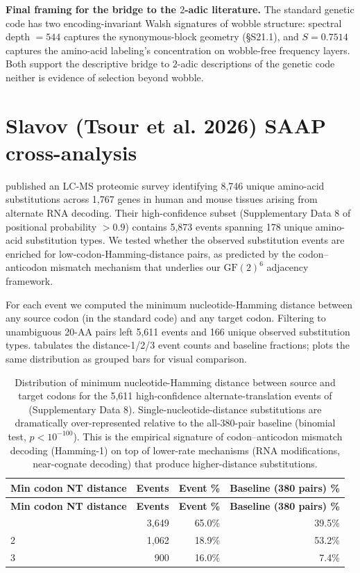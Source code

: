 \documentclass[preprint,11pt,authoryear,a4paper]{elsarticle}
\begin{document}
\textbf{Final framing for the bridge to the \(2\)-adic literature.} The
standard genetic code has two encoding-invariant Walsh signatures of
wobble structure: spectral depth \(= 544\) captures the synonymous-block
geometry (§S21.1), and \(S = 0.7514\) captures the amino-acid labeling's
concentration on wobble-free frequency layers. Both support the
descriptive bridge to \(2\)-adic descriptions of the genetic code
\citep{khrennikov2007, axelsson2024a} neither is evidence of selection
beyond wobble.

\section{Slavov (Tsour et al. 2026) SAAP
cross-analysis}\label{sec:s-slavov}

\citep{tsour2026} published an LC-MS proteomic survey identifying 8,746
unique amino-acid substitutions across 1,767 genes in human and mouse
tissues arising from alternate RNA decoding. Their high-confidence
subset (Supplementary Data 8 of \citep{tsour2026} positional probability
\(> 0.9\)) contains 5,873 events spanning 178 unique amino-acid
substitution types. We tested whether the observed substitution events
are enriched for low-codon-Hamming-distance pairs, as predicted by the
codon--anticodon mismatch mechanism that underlies our
\({\text{GF}(2)}^{6}\) adjacency framework.

For each event we computed the minimum nucleotide-Hamming distance
between any source codon (in the standard code) and any target codon.
Filtering to unambiguous 20-AA pairs left 5,611 events and 166 unique
observed substitution types.  tabulates the
distance-1/2/3 event counts and baseline fractions;
 plots the same distribution as grouped bars
for visual comparison.

\begin{longtable}[]{@{}lrrr@{}}
\caption{Distribution of minimum nucleotide-Hamming distance between
source and target codons for the 5,611 high-confidence
alternate-translation events of \citep{tsour2026} (Supplementary Data
8). Single-nucleotide-distance substitutions are dramatically
over-represented relative to the all-380-pair baseline (binomial test,
\(p < 10^{- 100}\)). This is the empirical signature of codon--anticodon
mismatch decoding (Hamming-1) on top of lower-rate mechanisms (RNA
modifications, near-cognate decoding) that produce higher-distance
substitutions.}\tabularnewline
\toprule\noalign{}
\textbf{Min codon NT distance} & \textbf{Events} & \textbf{Event \%} &
\textbf{Baseline (380 pairs) \%} \\
\midrule\noalign{}
\endfirsthead
\toprule\noalign{}
\textbf{Min codon NT distance} & \textbf{Events} & \textbf{Event \%} &
\textbf{Baseline (380 pairs) \%} \\
\midrule\noalign{}
\endhead
\bottomrule\noalign{}
\endlastfoot
1 & 3,649 & 65.0\% & 39.5\% \\
2 & 1,062 & 18.9\% & 53.2\% \\
3 & 900 & 16.0\% & 7.4\% \\
\end{longtable}
\end{document}
